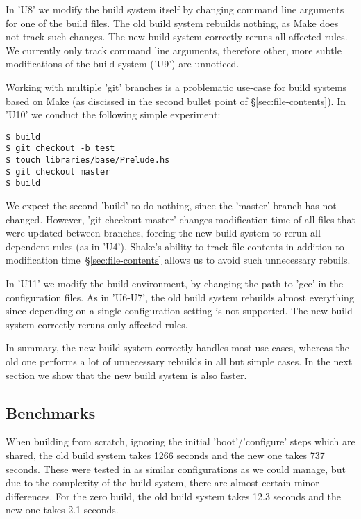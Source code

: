 In \lst'U8' we modify the build system itself by changing command line
arguments for one of the build files. The old build system rebuilds nothing,
as Make does not track such changes. The new build system correctly reruns all
affected rules. We currently only track command line arguments, therefore other,
more subtle modifications of the build system (\lst'U9') are unnoticed.

Working with multiple \lst'git' branches is a problematic use-case for build
systems based on Make (as discissed in the second bullet point of
\S\ref{sec:file-contents}). In \lst'U10' we conduct the following simple
experiment:

\begin{lstlisting}
$ build
$ git checkout -b test
$ touch libraries/base/Prelude.hs
$ git checkout master
$ build
\end{lstlisting}

We expect the second \lst'build' to do nothing, since the \lst'master'
branch has not changed. However, \lst'git checkout master' changes modification
time of all files that were updated between branches, forcing the new
build system to rerun all dependent rules (as in \lst'U4'). Shake's ability to
track file contents in addition to modification time~\S\ref{sec:file-contents}
allows us to avoid such unnecessary rebuils.

In \lst'U11' we modify the build environment, by changing the path to \lst'gcc'
in the configuration files. As in \lst'U6-U7', the old build system rebuilds
almost everything since depending on a single configuration setting is not
supported. The new build system correctly reruns only affected rules.

In summary, the new build system correctly handles most use cases, whereas
the old one performs a lot of unnecessary rebuilds in all but simple cases. In
the next section we show that the new build system is also faster.

\subsection{Benchmarks\label{sec:benchmarks}}

When building from scratch, ignoring the initial \lst'boot'/\lst'configure'
steps which are shared, the old build system takes 1266 seconds and the new
one takes 737 seconds. These were tested in as similar configurations as we could
manage, but due to the complexity of the build system, there are almost certain
minor differences. For the zero build, the old build system takes 12.3
seconds and the new one takes 2.1 seconds. 

